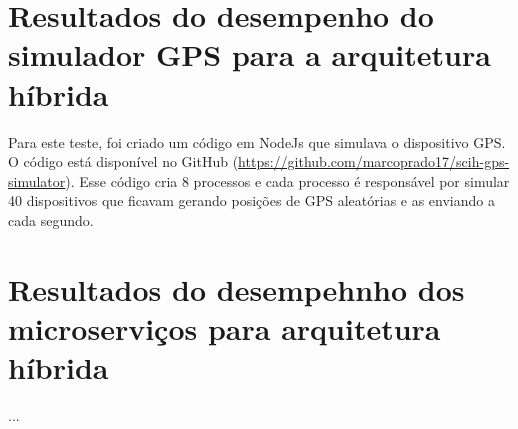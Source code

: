 
\section{Resultados do desempenho do simulador GPS para a arquitetura híbrida}

Para este teste, foi criado um código em NodeJs que simulava o dispositivo GPS. O código está disponível no GitHub (\href{https://github.com/marcoprado17/scih-gps-simulator}{https://github.com/marcoprado17/scih-gps-simulator}). Esse código cria 8 processos e cada processo é responsável por simular 40 dispositivos que ficavam gerando posições de GPS aleatórias e as enviando a cada segundo.





\section{Resultados do desempehnho dos microserviços para arquitetura híbrida}

...
